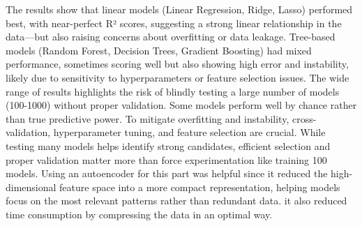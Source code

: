 \documentclass[
  letterpaper,
  DIV=11,
  numbers=noendperiod]{scrartcl}
\begin{document}
The results show that linear models (Linear Regression, Ridge, Lasso)
performed best, with near-perfect R² scores, suggesting a strong linear
relationship in the data---but also raising concerns about overfitting
or data leakage. Tree-based models (Random Forest, Decision Trees,
Gradient Boosting) had mixed performance, sometimes scoring well but
also showing high error and instability, likely due to sensitivity to
hyperparameters or feature selection issues. The wide range of results
highlights the risk of blindly testing a large number of models
(100-1000) without proper validation. Some models perform well by chance
rather than true predictive power. To mitigate overfitting and
instability, cross-validation, hyperparameter tuning, and feature
selection are crucial. While testing many models helps identify strong
candidates, efficient selection and proper validation matter more than
force experimentation like training 100 models. Using an autoencoder for
this part was helpful since it reduced the high-dimensional feature
space into a more compact representation, helping models focus on the
most relevant patterns rather than redundant data. it also reduced time
consumption by compressing the data in an optimal way.
\end{document}
